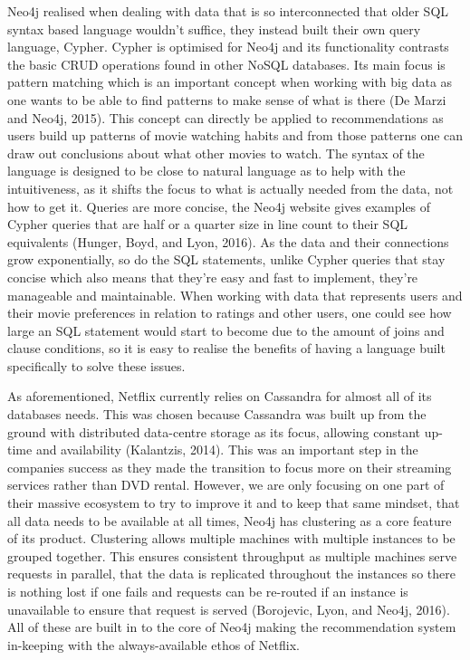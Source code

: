 \documentclass[a4paper]{article}
\begin{document}
Neo4j realised when dealing with data that is so interconnected that older SQL syntax based language wouldn't suffice, they instead built their own query language, Cypher. Cypher is optimised for Neo4j and its functionality contrasts the basic CRUD operations found in other NoSQL databases. Its main focus is pattern matching which is an important concept when working with big data as one wants to be able to find patterns to make sense of what is there (De Marzi and Neo4j, 2015). This concept can directly be applied to recommendations as users build up patterns of movie watching habits and from those patterns one can draw out conclusions about what other movies to watch. The syntax of the language is designed to be close to natural language as to help with the intuitiveness, as it shifts the focus to what is actually needed from the data, not how to get it. Queries are more concise, the Neo4j website gives examples of Cypher queries that are half or a quarter size in line count to their SQL equivalents (Hunger, Boyd, and Lyon, 2016). As the data and their connections grow exponentially, so do the SQL statements, unlike Cypher queries that stay concise which also means that they're easy and fast to implement, they're manageable and maintainable. When working with data that represents users and their movie preferences in relation to ratings and other users, one could see how large an SQL statement would start to become due to the amount of joins and clause conditions, so it is easy to realise the benefits of having a language built specifically to solve these issues. \par

As aforementioned, Netflix currently relies on Cassandra for almost all of its databases needs. This was chosen because Cassandra was built up from the ground with distributed data-centre storage as its focus, allowing constant up-time and availability (Kalantzis, 2014). This was an important step in the companies success as they made the transition to focus more on their streaming services rather than DVD rental. However, we are only focusing on one part of their massive ecosystem to try to improve it and to keep that same mindset, that all data needs to be available at all times, Neo4j has clustering as a core feature of its product. Clustering allows multiple machines with multiple instances to be grouped together. This ensures consistent throughput as multiple machines serve requests in parallel, that the data is replicated throughout the instances so there is nothing lost if one fails and requests can be re-routed if an instance is unavailable to ensure that request is served (Borojevic, Lyon, and Neo4j, 2016). All of these are built in to the core of Neo4j making the recommendation system in-keeping with the always-available ethos of Netflix. \par
\end{document}

